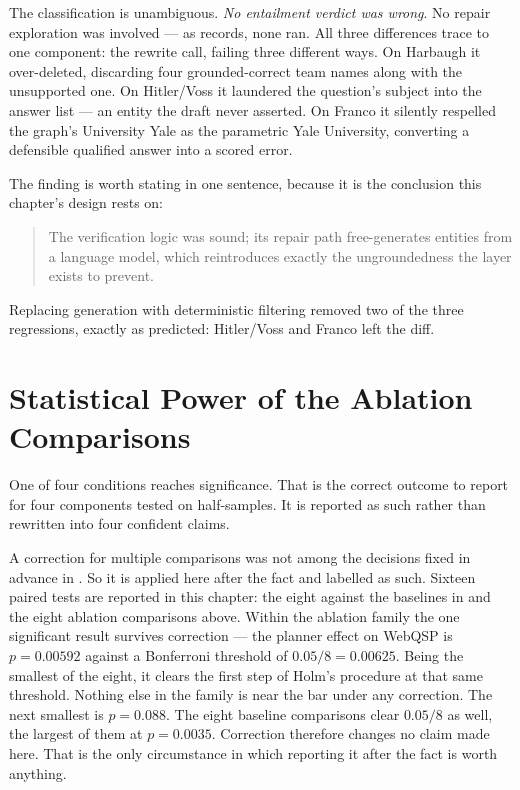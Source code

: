 The classification is unambiguous. \emph{No entailment verdict was wrong}. No
repair exploration was involved --- as  records, none ran.
All three differences trace to one component: the rewrite call, failing three
different ways. On Harbaugh it over-deleted, discarding four grounded-correct
team names along with the unsupported one. On Hitler/Voss it laundered the
question's subject into the answer list --- an entity the draft never asserted.
On Franco it silently respelled the graph's \textsf{University Yale} as the
parametric \textsf{Yale University}, converting a defensible qualified answer
into a scored error.

The finding is worth stating in one sentence, because it is the conclusion this
chapter's design rests on:

\begin{quote}
The verification logic was sound; its repair path free-generates entities from a
language model, which reintroduces exactly the ungroundedness the layer exists
to prevent.
\end{quote}

Replacing generation with deterministic filtering removed two of the three
regressions, exactly as predicted: Hitler/Voss and Franco left the diff.


\section{Statistical Power of the Ablation Comparisons}\label{app:power}

One of four conditions reaches significance. That is the correct outcome to
report for four components tested on half-samples. It is
reported as such rather than rewritten into four confident claims.

A correction for multiple comparisons was not among the decisions fixed in
advance in . So it is applied here after the fact and
labelled as such. Sixteen paired tests are reported in this chapter: the eight
against the baselines in  and the eight ablation comparisons
above. Within the ablation family the one significant result survives correction
--- the planner effect on WebQSP is $p = 0.00592$ against a Bonferroni threshold
of $0.05/8 = 0.00625$. Being the smallest of the eight, it clears the first
step of Holm's procedure at that same threshold. Nothing else in the family is
near the bar under any correction. The next smallest is $p = 0.088$. The eight
baseline comparisons clear $0.05/8$ as well, the largest of them at $p =
0.0035$. Correction therefore changes no claim made here. That is the only
circumstance in which reporting it after the fact is worth anything.

